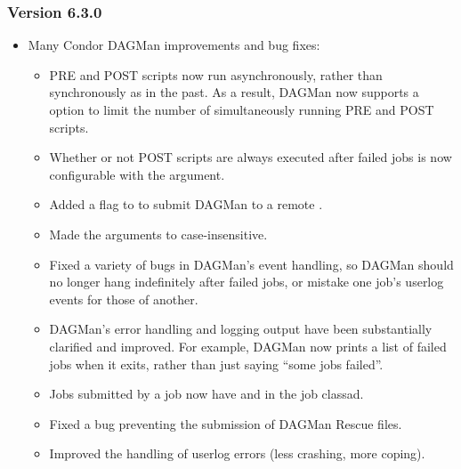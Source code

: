 \subsubsection{\label{sec:New-6-3-0}Version 6.3.0}

\begin{itemize}

\item
Many Condor DAGMan improvements and bug fixes:

\begin{itemize}

\item
PRE and POST scripts now run asynchronously, rather than synchronously
as in the past.  As a result, DAGMan now supports a 
option to limit the number of simultaneously running PRE and POST
scripts.

\item
Whether or not POST scripts are always executed after failed jobs is
now configurable with the  argument.

\item
Added a  flag to  to submit DAGMan to a
remote .

\item
Made the arguments to  case-insensitive.

\item
Fixed a variety of bugs in DAGMan's event handling, so DAGMan should
no longer hang indefinitely after failed jobs, or mistake one job's
userlog events for those of another.

\item
DAGMan's error handling and logging output have been substantially
clarified and improved.  For example, DAGMan now prints a list of
failed jobs when it exits, rather than just saying ``some jobs
failed''.

\item
Jobs submitted by a  job now have 
and  in the job classad.

\item
Fixed a  bug preventing the submission of DAGMan
Rescue files.

\item
Improved the handling of userlog errors (less crashing, more coping).


\end{itemize}
\end{itemize}
